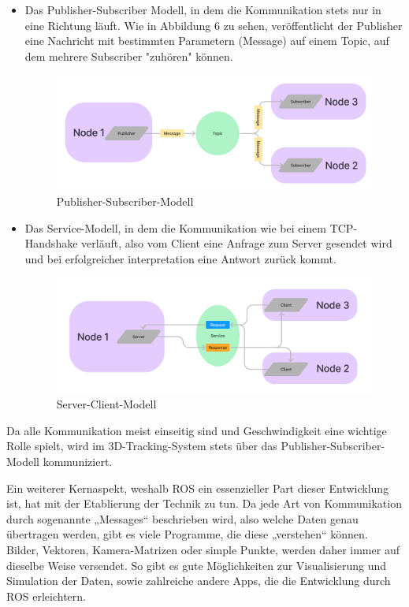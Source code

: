 \documentclass[12pt, ngerman]{article}
\begin{document}
\begin{itemize}
  \item Das Publisher-Subscriber Modell, in dem die Kommunikation stets nur in eine Richtung läuft. Wie in Abbildung 6 zu sehen, veröffentlicht der Publisher eine Nachricht mit bestimmten Parametern (Message) auf einem Topic, auf dem mehrere Subscriber "zuhören" können. 
  \begin{figure}[h]
    \includegraphics[angle=0,width=\linewidth]{Publisher.png}
    \caption{Publisher-Subscriber-Modell}
  \end{figure}
  \item Das Service-Modell, in dem die Kommunikation wie bei einem TCP-Handshake verläuft, also vom Client eine Anfrage zum Server gesendet wird und bei erfolgreicher interpretation eine Antwort zurück kommt. 
  \begin{figure}[h]
    \includegraphics[angle=0,width=\linewidth]{Server.png}
    \caption{Server-Client-Modell}
  \end{figure}
\end{itemize}

Da alle Kommunikation meist einseitig sind und Geschwindigkeit eine wichtige Rolle spielt, wird im 3D-Tracking-System stets über das Publisher-Subscriber-Modell kommuniziert.

Ein weiterer Kernaspekt, weshalb ROS ein essenzieller Part dieser Entwicklung ist, hat mit der Etablierung der Technik zu tun. Da jede Art von Kommunikation durch sogenannte „Messages“ beschrieben wird, also welche Daten genau übertragen werden, gibt es viele Programme, die diese „verstehen“ können. Bilder, Vektoren, Kamera-Matrizen oder simple Punkte, werden daher immer auf dieselbe Weise versendet. So gibt es gute Möglichkeiten zur Visualisierung und Simulation der Daten, sowie zahlreiche andere Apps, die die Entwicklung durch ROS erleichtern. 
\end{document}
